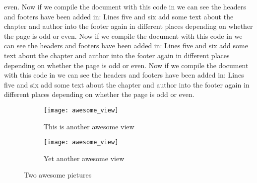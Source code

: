 even. Now if we compile the document with this code in we can see the headers and footers have been added in: Lines five and six add some text about the chapter and author into the footer again in different places depending on whether the page is odd or even. Now if we compile the document with this code in we can see the headers and footers have been added in: Lines five and six add some text about the chapter and author into the footer again in different places depending on whether the page is odd or even. Now if we compile the document with this code in we can see the headers and footers have been added in: Lines five and six add some text about the chapter and author into the footer again in different places depending on whether the page is odd or even. 
 
  \begin{figure}[h]
    \centering
    \begin{subfigure}[b]{0.45\textwidth}
        \centering
        \texttt{[image: awesome\_view]}
        \caption{This is another awesome view}
        \label{fig:another_awesome_view_a}
    \end{subfigure}
    \hfill
    \begin{subfigure}[b]{0.45\textwidth}
        \centering
        \texttt{[image: awesome\_view]}
        \caption{Yet another awesome view}
        \label{fig:another_awesome_view_b}
    \end{subfigure} 
    \caption{Two awesome pictures}
    \label{fig:two_awesome_pictures}
 \end{figure}
 
